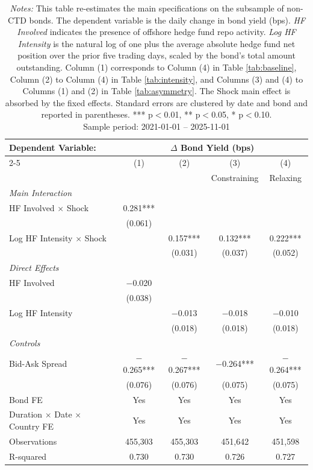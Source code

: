 \documentclass[english, 11pt, oneside]{article}
\begin{document}
\begin{table}[h!]
\centering
\caption{\textbf{Excluding CTD Bonds}}
\footnotesize
\setlength{\tabcolsep}{8pt}
\renewcommand{\arraystretch}{1.1}
\begin{tabular}{l c c c c}
\toprule
\textbf{Dependent Variable:} & \multicolumn{4}{c}{\textbf{$\Delta$ Bond Yield (bps)}} \\
\cmidrule(lr){2-5}
 & (1) & (2) & (3) & (4) \\
 & & & Constraining & Relaxing \\
\midrule
\textit{Main Interaction} & & & & \\
HF Involved $\times$ Shock & 0.281*** & & & \\
 & (0.061) & & & \\
Log HF Intensity $\times$ Shock & & 0.157*** & 0.132*** & 0.222*** \\
 & & (0.031) & (0.037) & (0.052) \\
\addlinespace
\textit{Direct Effects} & & & & \\
HF Involved & $-$0.020 & & & \\
 & (0.038) & & & \\
Log HF Intensity & & $-$0.013 & $-$0.018 & $-$0.010 \\
 & & (0.018) & (0.018) & (0.018) \\
\addlinespace
\textit{Controls} & & & & \\
Bid-Ask Spread & $-$0.265*** & $-$0.267*** & $-$0.264*** & $-$0.264*** \\
 & (0.076) & (0.076) & (0.075) & (0.075) \\
\midrule
Bond FE & Yes & Yes & Yes & Yes \\
Duration $\times$ Date $\times$ Country FE & Yes & Yes & Yes & Yes \\
\midrule
Observations & 455,303 & 455,303 & 451,642 & 451,598 \\
R-squared & 0.730 & 0.730 & 0.726 & 0.727 \\
\bottomrule
\end{tabular}
\label{tab:no_ctd}
\caption*{\textit{Notes:} This table re-estimates the main specifications on the subsample of non-CTD bonds. The dependent variable is the daily change in bond yield (bps). \textit{HF Involved} indicates the presence of offshore hedge fund repo activity. \textit{Log HF Intensity} is the natural log of one plus the average absolute hedge fund net position over the prior five trading days, scaled by the bond's total amount outstanding. Column (1) corresponds to Column (4) in Table \ref{tab:baseline}, Column (2) to Column (4) in Table \ref{tab:intensity}, and Columns (3) and (4) to Columns (1) and (2) in Table \ref{tab:asymmetry}. The Shock main effect is absorbed by the fixed effects. Standard errors are clustered by date and bond and reported in parentheses. *** p$<$0.01, ** p$<$0.05, * p$<$0.10. \\ Sample period: 2021-01-01 -- 2025-11-01}
\end{table}
\end{document}
